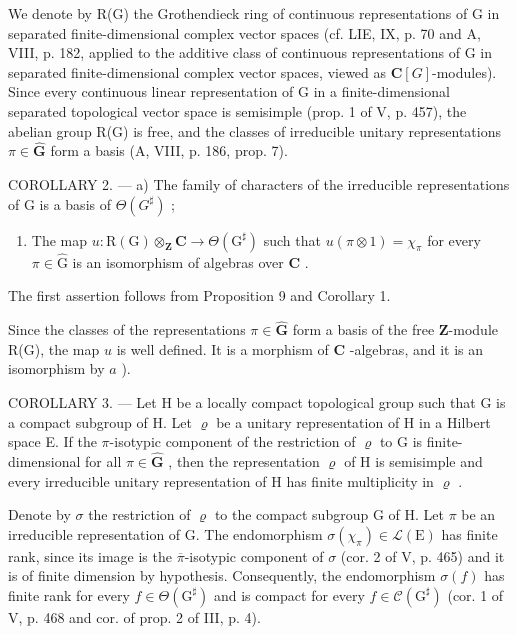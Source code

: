 We denote by R(G) the Grothendieck ring of continuous representations of G in separated finite-dimensional complex vector spaces (cf. LIE, IX, p. 70 and A, VIII, p. 182, applied to the additive class of continuous representations of G in separated finite-dimensional complex vector spaces, viewed as \(\mathbf{C}[G]\)-modules). Since every continuous linear representation of G in a finite-dimensional separated topological vector space is semisimple (prop. 1 of V, p. 457), the abelian group R(G) is free, and the classes of irreducible unitary representations \(\pi \in \widehat{\mathbf{G}}\) form a basis (A, VIII, p. 186, prop. 7).

COROLLARY 2. --- a) The family of characters of the irreducible representations of G is a basis of \(\Theta(G^{\sharp})\) ;

\begin{enumerate}
\def\labelenumi{\alph{enumi})}
\setcounter{enumi}{1}
\tightlist
\item
  The map \(u: \mathrm{R}(\mathrm{G}) \otimes_{\mathbf{Z}} \mathbf{C} \to \Theta(\mathrm{G}^{\sharp})\) such that \(u(\pi \otimes 1) = \chi_{\pi}\) for every \(\pi \in \widehat{\mathrm{G}}\) is an isomorphism of algebras over \(\mathbf{C}\) .
\end{enumerate}

The first assertion follows from Proposition 9 and Corollary 1.

Since the classes of the representations \(\pi \in \widehat{\mathbf{G}}\) form a basis of the free \(\mathbf{Z}\)-module R(G), the map \(u\) is well defined. It is a morphism of \(\mathbf{C}\) -algebras, and it is an isomorphism by \(a\) ).

COROLLARY 3. --- Let H be a locally compact topological group such that G is a compact subgroup of H. Let \(\varrho\) be a unitary representation of H in a Hilbert space E. If the \(\pi\)-isotypic component of the restriction of \(\varrho\) to G is finite-dimensional for all \(\pi \in \widehat{\mathbf{G}}\) , then the representation \(\varrho\) of H is semisimple and every irreducible unitary representation of H has finite multiplicity in \(\varrho\) .

Denote by \(\sigma\) the restriction of \(\varrho\) to the compact subgroup G of H. Let \(\pi\) be an irreducible representation of G. The endomorphism \(\sigma(\chi_{\pi}) \in \mathcal{L}(\mathrm{E})\) has finite rank, since its image is the \(\overline{\pi}\)-isotypic component of \(\sigma\) (cor. 2 of V, p. 465) and it is of finite dimension by hypothesis. Consequently, the endomorphism \(\sigma(f)\) has finite rank for every \(f \in \Theta(\mathrm{G}^{\sharp})\) and is compact for every \(f \in \mathcal{C}(\mathrm{G}^{\sharp})\) (cor. 1 of V, p. 468 and cor. of prop. 2 of III, p. 4).

